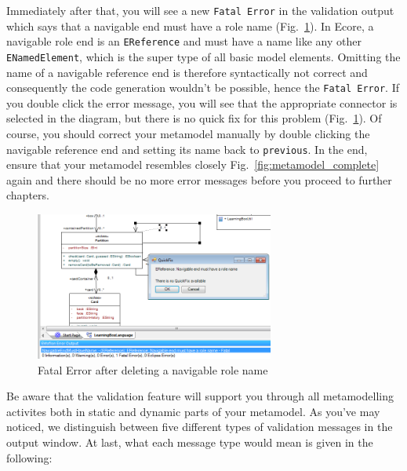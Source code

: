 Immediately after that, you will see a new \texttt{Fatal Error} in the validation output which says that a navigable end must have a role name (Fig.~\ref{fig:fatal-error}).
In Ecore, a navigable role end is an \texttt{EReference} and must have a name like any other \texttt{ENamedElement}, which is the super type of all basic model elements.
Omitting the name of a navigable reference end is therefore syntactically not correct and consequently the code generation wouldn't be possible, hence the \texttt{Fatal Error}. 
If you double click the error message, you will see that the appropriate connector is  selected in the diagram, but there is no quick fix for this problem (Fig.~\ref{fig:fatal-error}). 
Of course, you should correct your metamodel manually by double clicking the navigable reference end and setting its name back to
\texttt{previous}. 
In the end, ensure that your metamodel resembles closely Fig.~\ref{fig:metamodel_complete} again and there should be no more error messages before you proceed to further chapters.

\begin{figure}[htbp]
	\centering
  \includegraphics[width=0.7\textwidth]{pics/memBoxBilder/memBox47} 
	\caption{Fatal Error after deleting a navigable role name}
	\label{fig:fatal-error}
\end{figure}

Be aware that the validation feature will support you through all metamodelling
activites both in static and dynamic parts of your metamodel. As you've may
noticed, we distinguish between five different types of validation messages in
the output window. At last, what each message type would mean is given in the
following:

